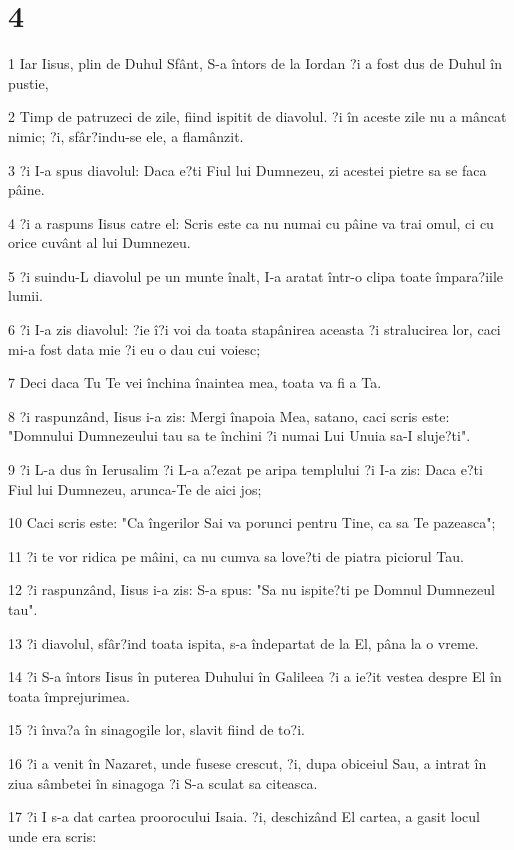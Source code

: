 \chapter{4}

\par 1 Iar Iisus, plin de Duhul Sfânt, S-a întors de la Iordan ?i a fost dus de Duhul în pustie,
\par 2 Timp de patruzeci de zile, fiind ispitit de diavolul. ?i în aceste zile nu a mâncat nimic; ?i, sfâr?indu-se ele, a flamânzit.
\par 3 ?i I-a spus diavolul: Daca e?ti Fiul lui Dumnezeu, zi acestei pietre sa se faca pâine.
\par 4 ?i a raspuns Iisus catre el: Scris este ca nu numai cu pâine va trai omul, ci cu orice cuvânt al lui Dumnezeu.
\par 5 ?i suindu-L diavolul pe un munte înalt, I-a aratat într-o clipa toate împara?iile lumii.
\par 6 ?i I-a zis diavolul: ?ie î?i voi da toata stapânirea aceasta ?i stralucirea lor, caci mi-a fost data mie ?i eu o dau cui voiesc;
\par 7 Deci daca Tu Te vei închina înaintea mea, toata va fi a Ta.
\par 8 ?i raspunzând, Iisus i-a zis: Mergi înapoia Mea, satano, caci scris este: "Domnului Dumnezeului tau sa te închini ?i numai Lui Unuia sa-I sluje?ti".
\par 9 ?i L-a dus în Ierusalim ?i L-a a?ezat pe aripa templului ?i I-a zis: Daca e?ti Fiul lui Dumnezeu, arunca-Te de aici jos;
\par 10 Caci scris este: "Ca îngerilor Sai va porunci pentru Tine, ca sa Te pazeasca";
\par 11 ?i te vor ridica pe mâini, ca nu cumva sa love?ti de piatra piciorul Tau.
\par 12 ?i raspunzând, Iisus i-a zis: S-a spus: "Sa nu ispite?ti pe Domnul Dumnezeul tau".
\par 13 ?i diavolul, sfâr?ind toata ispita, s-a îndepartat de la El, pâna la o vreme.
\par 14 ?i S-a întors Iisus în puterea Duhului în Galileea ?i a ie?it vestea despre El în toata împrejurimea.
\par 15 ?i înva?a în sinagogile lor, slavit fiind de to?i.
\par 16 ?i a venit în Nazaret, unde fusese crescut, ?i, dupa obiceiul Sau, a intrat în ziua sâmbetei în sinagoga ?i S-a sculat sa citeasca.
\par 17 ?i I s-a dat cartea proorocului Isaia. ?i, deschizând El cartea, a gasit locul unde era scris:
